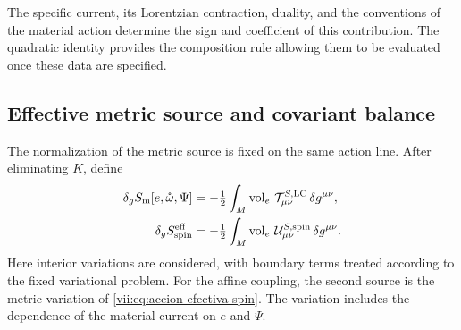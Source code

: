 The specific current, its Lorentzian contraction, duality, and the
conventions of the material action determine the sign and coefficient
of this contribution. The quadratic identity provides the composition
rule allowing them to be evaluated once these data are specified.

\subsection{Effective metric source and covariant balance}
\label{vii:subsec:fuente-metrica-efectiva}

The normalization of the metric source is fixed on the same action
line. After eliminating \(K\), define
\begin{align}
 \delta_g S_{\rm m}[e,\mathring\omega,\Psi]
 &=-\tfrac12\int_M\operatorname{vol}_e\,
                   \mathcal T^{S,\rm LC}_{\mu\nu}\,\delta g^{\mu\nu},
 \\
 \delta_g S_{\rm spin}^{\rm eff}
 &=-\tfrac12\int_M\operatorname{vol}_e\,
                   \mathcal U^{S,\rm spin}_{\mu\nu}\,\delta g^{\mu\nu}.
 \label{vii:eq:fuentes-normalizadas-accion}
\end{align}
Here interior variations are considered, with boundary terms
treated according to the fixed variational problem. For the affine
coupling, the second source is the metric variation of
\eqref{vii:eq:accion-efectiva-spin}. The variation includes the dependence
of the material current on \(e\) and \(\Psi\).


